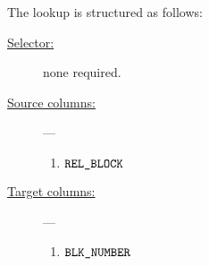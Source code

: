 The lookup is structured as follows:
\begin{description}
	\item[\underline{Selector:}] none required.
	\item[\underline{Source columns:}] ---
		\begin{enumerate}
			\item $\texttt{REL\_BLOCK}$
		\end{enumerate}
	\item[\underline{Target columns:}] ---
		\begin{enumerate}
			\item $\texttt{BLK\_NUMBER}$
		\end{enumerate}
\end{description}
